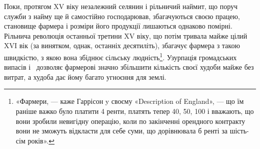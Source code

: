 Поки, протягом XV віку незалежний селянин і рільничий
наймит, що поруч служби з найму ще й самостійно господарював,
збагачуються своєю працею, становище фармера і розміри його
продукції лишаються однаково помірні. Рільнича революція
останньої третини XV віку, що потім тривала майже цілий XVI вік
(за винятком, однак, останніх десятиліть), збагачує фармера з
такою швидкістю, з якою вона збіднює сільську людність\footnote{
«Фармери, — каже Гаррісон y своєму «Description of England», —
що їм раніше важко було платити 4 ренти, платять тепер 40, 50, 100 і вважають, що вони зробили невигідну операцію,
коли по закінченні орендного контракту вони не зможуть відкласти
для себе суми, що дорівнювала б ренті за шість-сім років».
}.
Узурпація громадських випасів і~ дозволяє фармерові значно
збільшити кількість своєї худоби майже без витрат, а худоба дає
йому багато угноєння для землі.

